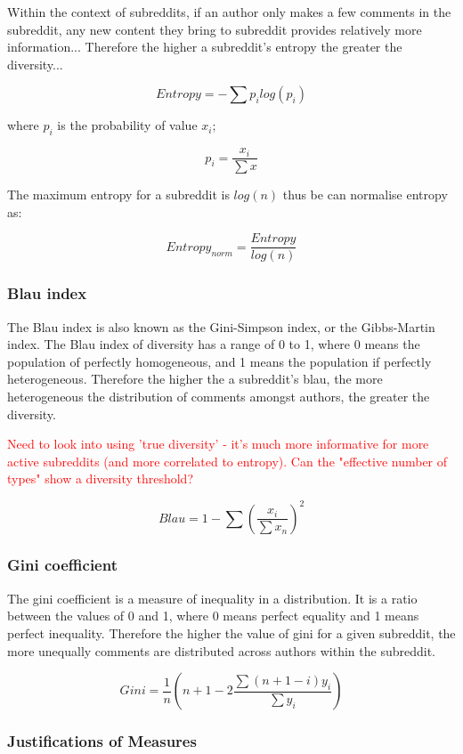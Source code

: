 \documentclass{article}
\begin{document}
Within the context of subreddits, if an author only makes a few comments in the subreddit, any new content they bring to subreddit provides relatively more information... Therefore the higher a subreddit's entropy the greater the diversity...


$$Entropy = -\sum p_ilog(p_i)$$

where $p_i$ is the probability of value $x_i$;

$$p_i = \frac{x_i}{\sum x}$$

The maximum entropy for a subreddit is $log(n)$ thus be can normalise entropy as:

$$Entropy_{norm} = \frac{Entropy}{log(n)}$$

\subsubsection{Blau index}

The Blau index is also known as the Gini-Simpson index, or the Gibbs-Martin index. The Blau index of diversity has a range of 0 to 1, where 0 means the population of perfectly homogeneous, and 1 means the population if perfectly heterogeneous. Therefore the higher the a subreddit's blau, the more heterogeneous the distribution of comments amongst authors, the greater the diversity.


\textcolor{red}{Need to look into using 'true diversity' - it's much more informative for more active subreddits (and more correlated to entropy). Can the "effective number of types" show a diversity threshold?}

$$Blau = 1 - \sum (\frac{x_i}{\sum x_n})^{2}$$

\subsubsection{Gini coefficient}

The gini coefficient is a measure of inequality in a distribution. It is a ratio between the values of 0 and 1, where 0 means perfect equality and 1 means perfect inequality. Therefore the higher the value of gini for a given subreddit, the more unequally comments are distributed across authors within the subreddit.

$$Gini = \frac{1}{n}(n+1-2\frac{\sum(n+1-i)y_i}{\sum y_i})$$

\subsubsection{Justifications of Measures}
\end{document}
